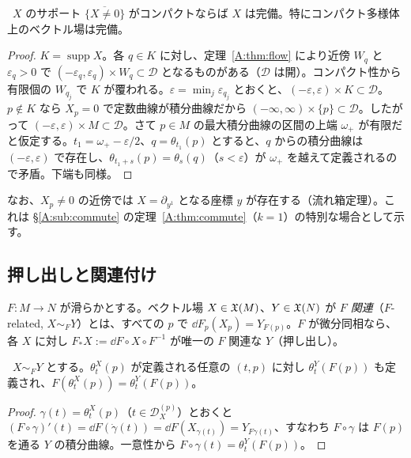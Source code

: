 \begin{prop}[完備性の判定]\label{A:prop:complete}
\tP\ $X$ のサポート $\overline{\{X\ne0\}}$ がコンパクトならば $X$ は完備。特にコンパクト多様体上のベクトル場は完備。
\end{prop}
\begin{proof}
$K=\operatorname{supp}X$。各 $q\in K$ に対し、定理~\ref{A:thm:flow} により近傍 $W_q$ と $\varepsilon_q>0$ で $(-\varepsilon_q,\varepsilon_q)\times W_q\subset\mathcal D$ となるものがある（$\mathcal D$ は開）。コンパクト性から有限個の $W_{q_j}$ で $K$ が覆われる。$\varepsilon=\min_j\varepsilon_{q_j}$ とおくと、$(-\varepsilon,\varepsilon)\times K\subset\mathcal D$。$p\notin K$ なら $X_p=0$ で定数曲線が積分曲線だから $(-\infty,\infty)\times\{p\}\subset\mathcal D$。したがって $(-\varepsilon,\varepsilon)\times M\subset\mathcal D$。さて $p\in M$ の最大積分曲線の区間の上端 $\omega_+$ が有限だと仮定する。$t_1=\omega_+-\varepsilon/2$、$q=\theta_{t_1}(p)$ とすると、$q$ からの積分曲線は $(-\varepsilon,\varepsilon)$ で存在し、$\theta_{t_1+s}(p)=\theta_s(q)$（$s<\varepsilon$）が $\omega_+$ を越えて定義されるので矛盾。下端も同様。
\end{proof}

なお、$X_p\ne0$ の近傍では $X=\partial_{y^1}$ となる座標 $y$ が存在する（流れ箱定理）。これは §\ref{A:sub:commute} の定理~\ref{A:thm:commute}（$k=1$）の特別な場合として示す。

\subsection{押し出しと関連付け}
\begin{defn}
$F:M\to N$ が滑らかとする。ベクトル場 $X\in\mathfrak X(M)$、$Y\in\mathfrak X(N)$ が \emph{$F$ 関連}（$F$-related, $X\sim_FY$）とは、すべての $p$ で $\dd F_p(X_p)=Y_{F(p)}$。$F$ が微分同相なら、各 $X$ に対し $F_*X:=\dd F\circ X\circ F^{-1}$ が唯一の $F$ 関連な $Y$（押し出し）。
\end{defn}

\begin{prop}[流れの自然性]\label{A:prop:related}
\tP\ $X\sim_FY$ とする。$\theta^X_t(p)$ が定義される任意の $(t,p)$ に対し $\theta^Y_t(F(p))$ も定義され、$F(\theta^X_t(p))=\theta^Y_t(F(p))$。
\end{prop}
\begin{proof}
$\gamma(t)=\theta^X_t(p)$（$t\in\mathcal D^{(p)}_X$）とおくと $(F\circ\gamma)'(t)=\dd F(\dot\gamma(t))=\dd F(X_{\gamma(t)})=Y_{F\gamma(t)}$、すなわち $F\circ\gamma$ は $F(p)$ を通る $Y$ の積分曲線。一意性から $F\circ\gamma(t)=\theta_t^Y(F(p))$。
\end{proof}

